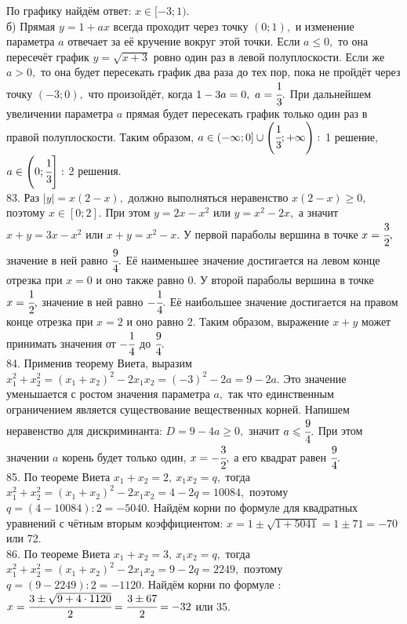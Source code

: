 \documentclass[12pt]{article}
\begin{document}
По графику найдём ответ: $x\in[-3;1).$\\
б) Прямая $y=1+ax$ всегда проходит через точку $(0;1),$ и изменение параметра $a$ отвечает за её кручение вокруг этой точки. Если $a\leqslant0,$ то она пересечёт график $y=\sqrt{x+3}$ ровно один раз в левой полуплоскости. Если же $a>0,$ то она будет пересекать график два раза до тех пор, пока не пройдёт через точку $(-3;0),$ что произойдёт, когда $1-3a=0,\ a=\cfrac{1}{3}.$ При дальнейшем увеличении параметра $a$ прямая будет пересекать график только один раз в правой полуплоскости. Таким образом, $a\in(-\infty;0]\cup\left(\cfrac{1}{3};+\infty\right):$ 1 решение, $a\in\left(0;\cfrac{1}{3}\right]:$ 2 решения.\\
83.  Раз $|y|=x(2-x),$ должно выполняться неравенство $x(2-x)\geqslant0,$ поэтому $x\in[0;2].$ При этом $y=2x-x^2$ или $y=x^2-2x,$ а значит $x+y=3x-x^2$ или $x+y=x^2-x.$ У первой параболы вершина в точке $x=\cfrac{3}{2},$ значение в ней равно $\cfrac{9}{4}.$ Её наименьшее значение достигается на левом конце отрезка при $x=0$ и оно также равно 0. У второй параболы вершина в точке $x=\cfrac{1}{2},$ значение в ней равно $-\cfrac{1}{4}.$ Её наибольшее значение достигается на правом конце отрезка при $x=2$ и оно равно 2. Таким образом, выражение $x+y$ может принимать значения от $-\cfrac{1}{4}$ до $\cfrac{9}{4}.$\\
84. Применив теорему Виета, выразим $x_1^2+x_2^2=(x_1+x_2)^2-2x_1x_2=(-3)^2-2a=9-2a.$ Это значение уменьшается с ростом значения параметра $a,$ так что единственным ограничением является существование вещественных корней. Напишем неравенство для дискриминанта: $D=9-4a\geqslant0,$ значит $a\leqslant \cfrac{9}{4}.$ При этом значении $a$ корень будет только один, $x=-\cfrac{3}{2},$ а его квадрат равен $\cfrac{9}{4}.$\\
85. По теореме Виета $x_1+x_2=2,\ x_1x_2=q,$ тогда $x_1^2+x_2^2=(x_1+x_2)^2-2x_1x_2=4-2q=10084,$ поэтому $q=(4-10084):2=-5040.$ Найдём корни по формуле для квадратных уравнений с чётным вторым коэффициентом: $x=1\pm\sqrt{1+5041}=1\pm71=-70$ или 72.\\
86. По теореме Виета $x_1+x_2=3,\ x_1x_2=q,$ тогда $x_1^2+x_2^2=(x_1+x_2)^2-2x_1x_2=9-2q=2249,$ поэтому $q=(9-2249):2=-1120.$ Найдём корни по формуле : $x=\cfrac{3\pm\sqrt{9+4\cdot1120}}{2}=\cfrac{3\pm67}{2}=-32$ или 35.\\
\end{document}
